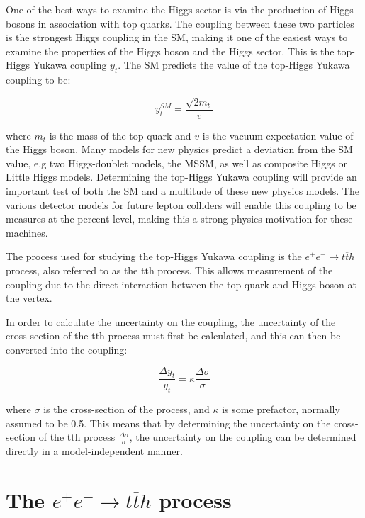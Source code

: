 One of the best ways to examine the Higgs sector is via the production of Higgs bosons in association with top quarks. The coupling between these two particles is the strongest Higgs coupling in the \acrshort{SM}, making it one of the easiest ways to examine the properties of the Higgs boson and the Higgs sector. This is the top-Higgs Yukawa coupling $y_t$. The \acrlong{SM} predicts the value of the top-Higgs Yukawa coupling to be:

\begin{equation}
	y_t^{SM} = \frac{\sqrt{2m_t}}{v}
\label{eq:yukawacoupling-sm-value}
\end{equation}

where $m_t$ is the mass of the top quark and $v$ is the vacuum expectation value of the Higgs boson. Many models for new physics predict a deviation from the \acrshort{SM} value, e.g two Higgs-doublet models, the \acrfull{MSSM}, as well as composite Higgs or Little Higgs models. Determining the top-Higgs Yukawa coupling will provide an important test of both the \acrlong{SM} and a multitude of these new physics models. The various detector models for future lepton colliders will enable this coupling to be measures at the percent level, making this a strong physics motivation for these machines.

The process used for studying the top-Higgs Yukawa coupling is the $e^+ e^- \rightarrow t\overline{t}h$ process, also referred to as the tth process. This allows measurement of the coupling due to the direct interaction between the top quark and Higgs boson at the vertex.

In order to calculate the uncertainty on the coupling, the uncertainty of the cross-section of the tth process must first be calculated, and this can then be converted into the coupling:

\begin{equation}
	\frac{\Delta y_t}{y_t} = \kappa \frac{\Delta \sigma}{\sigma}
\label{eq:crosssection-to-yukawa}
\end{equation}

where $\sigma$ is the cross-section of the process, and $\kappa$ is some prefactor, normally assumed to be 0.5. This means that by determining the uncertainty on the cross-section of the tth process $\frac{\Delta \sigma}{\sigma}$, the uncertainty on the coupling can be determined directly in a model-independent manner. 


\section{The $e^+ e^- \rightarrow t\overline{t}h$ process}

